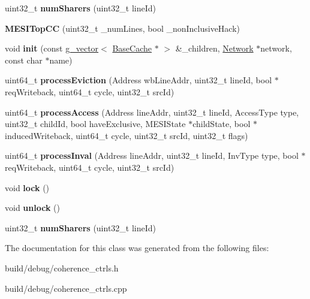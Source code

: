 \begin{DoxyCompactItemize}
\item 
\hypertarget{classMESITopCC_a32a67ec6f7c028fd128c59d74468eee5}{uint32\-\_\-t {\bfseries num\-Sharers} (uint32\-\_\-t line\-Id)}\label{classMESITopCC_a32a67ec6f7c028fd128c59d74468eee5}

\item 
\hypertarget{classMESITopCC_a0302722a6c769131461710395c808d6f}{{\bfseries M\-E\-S\-I\-Top\-C\-C} (uint32\-\_\-t \-\_\-num\-Lines, bool \-\_\-non\-Inclusive\-Hack)}\label{classMESITopCC_a0302722a6c769131461710395c808d6f}

\item 
\hypertarget{classMESITopCC_a1d0b9de1944d94b1c4a738f1bb826087}{void {\bfseries init} (const \hyperlink{classg__vector}{g\-\_\-vector}$<$ \hyperlink{classBaseCache}{Base\-Cache} $\ast$ $>$ \&\-\_\-children, \hyperlink{classNetwork}{Network} $\ast$network, const char $\ast$name)}\label{classMESITopCC_a1d0b9de1944d94b1c4a738f1bb826087}

\item 
\hypertarget{classMESITopCC_aa44dfd0280f94f9339fcaf8dc0e20269}{uint64\-\_\-t {\bfseries process\-Eviction} (Address wb\-Line\-Addr, uint32\-\_\-t line\-Id, bool $\ast$req\-Writeback, uint64\-\_\-t cycle, uint32\-\_\-t src\-Id)}\label{classMESITopCC_aa44dfd0280f94f9339fcaf8dc0e20269}

\item 
\hypertarget{classMESITopCC_aed318f9fff1699380161f8635fefc791}{uint64\-\_\-t {\bfseries process\-Access} (Address line\-Addr, uint32\-\_\-t line\-Id, Access\-Type type, uint32\-\_\-t child\-Id, bool have\-Exclusive, M\-E\-S\-I\-State $\ast$child\-State, bool $\ast$induced\-Writeback, uint64\-\_\-t cycle, uint32\-\_\-t src\-Id, uint32\-\_\-t flags)}\label{classMESITopCC_aed318f9fff1699380161f8635fefc791}

\item 
\hypertarget{classMESITopCC_a6eb7b6c5e4942218526507909627b260}{uint64\-\_\-t {\bfseries process\-Inval} (Address line\-Addr, uint32\-\_\-t line\-Id, Inv\-Type type, bool $\ast$req\-Writeback, uint64\-\_\-t cycle, uint32\-\_\-t src\-Id)}\label{classMESITopCC_a6eb7b6c5e4942218526507909627b260}

\item 
\hypertarget{classMESITopCC_a8cb3d0e20bc11cb818c0e179c9f31a4c}{void {\bfseries lock} ()}\label{classMESITopCC_a8cb3d0e20bc11cb818c0e179c9f31a4c}

\item 
\hypertarget{classMESITopCC_a24cc9111c6f1b6afa6ec60ba9005a42a}{void {\bfseries unlock} ()}\label{classMESITopCC_a24cc9111c6f1b6afa6ec60ba9005a42a}

\item 
\hypertarget{classMESITopCC_a32a67ec6f7c028fd128c59d74468eee5}{uint32\-\_\-t {\bfseries num\-Sharers} (uint32\-\_\-t line\-Id)}\label{classMESITopCC_a32a67ec6f7c028fd128c59d74468eee5}

\end{DoxyCompactItemize}


The documentation for this class was generated from the following files\-:\begin{DoxyCompactItemize}
\item 
build/debug/coherence\-\_\-ctrls.\-h\item 
build/debug/coherence\-\_\-ctrls.\-cpp\end{DoxyCompactItemize}
